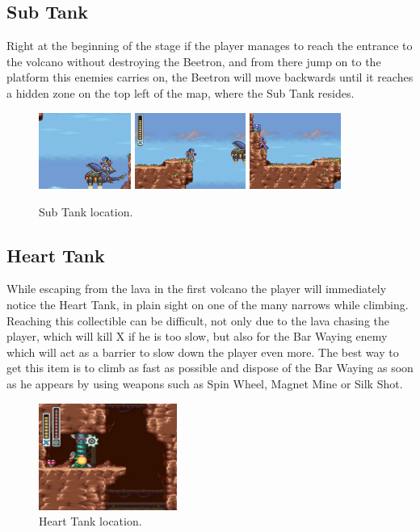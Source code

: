 \subsection{Sub Tank}
Right at the beginning of the stage if the player manages to reach the entrance to the volcano without destroying the Beetron, and from there jump on to the platform this enemies carries on, the Beetron will move backwards until it reaches a hidden zone on the top left of the map, where the Sub Tank resides. 

\begin{figure}[htp]
	\centering
	\includegraphics[height=2.5cm]{figures/X2/Flame_stag/Stag_tank_2.jpg}
	\includegraphics[height=2.5cm]{figures/X2/Flame_stag/Stag_tank_3.jpg}
	\includegraphics[height=2.5cm]{figures/X2/Flame_stag/Stag_tank.png}	
	\caption{Sub Tank location.}
\end{figure}


\subsection{Heart Tank}
While escaping from the lava in the first volcano the player will immediately notice the Heart Tank, in plain sight on one of the many narrows while climbing. Reaching this collectible can be difficult, not only due to the lava chasing the player, which will kill X if he is too slow, but also for the Bar Waying enemy which will act as a barrier to slow down the player  even more. The best way to get this item is to climb as fast as possible and dispose of the Bar Waying as soon as he appears by using weapons such as Spin Wheel, Magnet Mine or Silk Shot.
\begin{figure}[htp]
	\centering
	\includegraphics[height=3.5cm]{figures/X2/Flame_stag/Stag_heart.png}
	\caption{Heart Tank location.}
\end{figure}

